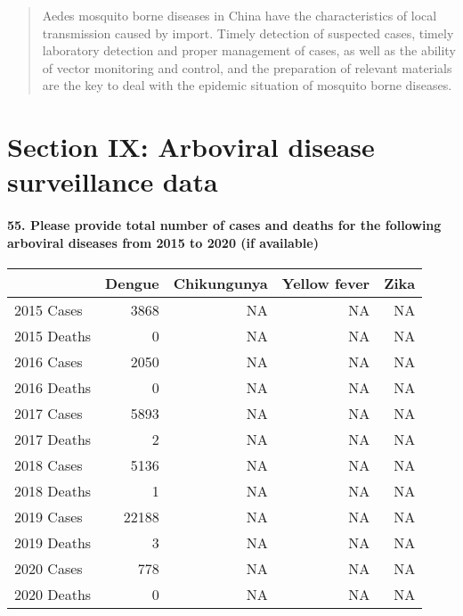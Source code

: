\documentclass[
]{article}
\begin{document}
\begin{quote}
Aedes mosquito borne diseases in China have the characteristics of local
transmission caused by import. Timely detection of suspected cases,
timely laboratory detection and proper management of cases, as well as
the ability of vector monitoring and control, and the preparation of
relevant materials are the key to deal with the epidemic situation of
mosquito borne diseases.
\end{quote}

\hypertarget{section-ix-arboviral-disease-surveillance-data}{%
\section{Section IX: Arboviral disease surveillance
data}\label{section-ix-arboviral-disease-surveillance-data}}

\hypertarget{please-provide-total-number-of-cases-and-deaths-for-the-following-arboviral-diseases-from-2015-to-2020-if-available}{%
\paragraph{55. Please provide total number of cases and deaths for the
following arboviral diseases from 2015 to 2020 (if
available)}\label{please-provide-total-number-of-cases-and-deaths-for-the-following-arboviral-diseases-from-2015-to-2020-if-available}}

\begin{longtable}[]{@{}lrrrr@{}}
\toprule
& Dengue & Chikungunya & Yellow fever & Zika \\
\midrule
\endhead
2015 Cases & 3868 & NA & NA & NA \\
2015 Deaths & 0 & NA & NA & NA \\
2016 Cases & 2050 & NA & NA & NA \\
2016 Deaths & 0 & NA & NA & NA \\
2017 Cases & 5893 & NA & NA & NA \\
2017 Deaths & 2 & NA & NA & NA \\
2018 Cases & 5136 & NA & NA & NA \\
2018 Deaths & 1 & NA & NA & NA \\
2019 Cases & 22188 & NA & NA & NA \\
2019 Deaths & 3 & NA & NA & NA \\
2020 Cases & 778 & NA & NA & NA \\
2020 Deaths & 0 & NA & NA & NA \\
\bottomrule
\end{longtable}
\end{document}
